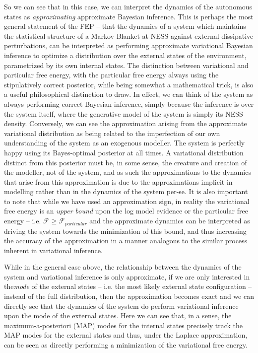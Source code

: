 So we can see that in this case, we can interpret the dynamics of the autonomous states as \emph{approximating} approximate Bayesian inference. This is perhaps the most general statement of the FEP -- that the dynamics of a system which maintains the statistical structure of a Markov Blanket at NESS against external dissipative perturbations, can be interpreted as performing approximate variational Bayesian inference to optimize a distribution over the external states of the environment, parametrized by its own internal states. The distinction between variational and particular free energy, with the particular free energy always using the stipulatively correct posterior, while being somewhat a mathematical trick, is also a useful philosophical distinction to draw. In effect, we can think of the system as always performing correct Bayesian inference, simply because the inference is over the system itself, where the generative model of the system is simply its NESS density. Conversely, we can see the approximation arising from the approximate variational distribution as being related to the imperfection of our own understanding of the system as an exogenous modeller. The system is perfectly happy using its Bayes-optimal posterior at all times. A variational distribution distinct from this posterior must be, in some sense, the creature and creation of the modeller, not of the system, and as such the approximations to the dynamics that arise from this approximation is due to the approximations implicit in modelling rather than in the dynamics of the system per-se. It is also important to note that while we have used an approximation sign, in reality the variational free energy is an \emph{upper bound} upon the log model evidence or the particular free energy -- i.e. $\mathcal{F} \geq \mathcal{F}_{particular}$ and the approximate dynamics can be interpreted as driving the system towards the minimization of this bound, and thus increasing the accuracy of the approximation in a manner analogous to the similar process inherent in variational inference.

While in the general case above, the relationship between the dynamics of the system and variational inference is only approximate, if we are only interested in the\emph{mode} of the external states -- i.e. the most likely external state configuration -- instead of the full distribution, then the approximation becomes exact and we can directly see that the dynamics of the system do perform variational inference upon the mode of the external states. Here we can see that, in a sense, the maximum-a-posteriori (MAP) modes for the internal states precisely track the MAP modes for the external states and thus, under the Laplace approximation, can be seen as directly performing a minimization of the variational free energy.

